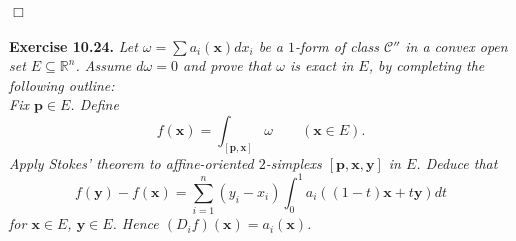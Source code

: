 \documentclass{article}
\begin{document}
$\Box$ \\\\






\textbf{Exercise 10.24.}
\emph{Let $\omega = \sum a_i(\mathbf{x}) dx_i$ be a $1$-form of class $\mathscr{C}''$
in a convex open set $E \subseteq \mathbb{R}^n$.
Assume $d\omega = 0$ and prove that $\omega$ is exact in $E$,
by completing the following outline:} \\

\emph{Fix $\mathbf{p} \in E$.
Define
\[
  f(\mathbf{x}) = \int_{[\mathbf{p},\mathbf{x}]} \omega
  \qquad
  (\mathbf{x} \in E).
\]
Apply Stokes' theorem to affine-oriented $2$-simplexs $[\mathbf{p},\mathbf{x},\mathbf{y}]$ in $E$.
Deduce that
\[
  f(\mathbf{y}) - f(\mathbf{x})
  = \sum_{i=1}^{n}(y_i - x_i) \int_{0}^{1} a_i((1-t)\mathbf{x} + t\mathbf{y}) dt
\]
for $\mathbf{x} \in E$, $\mathbf{y} \in E$.
Hence $(D_i f)(\mathbf{x}) = a_i(\mathbf{x})$.} \\
\end{document}
